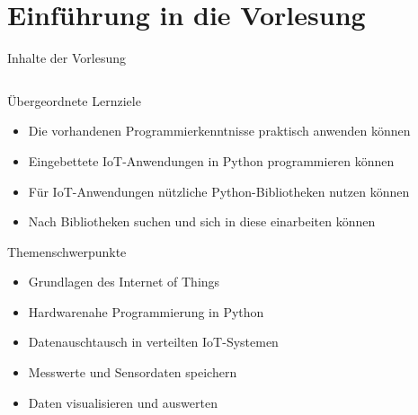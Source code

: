 \section{Einführung in die Vorlesung}
{
\scriptsize

\begin{frame}{Inhalte der Vorlesung}
    \begin{columns}
        \begin{column}[T]{.7\textwidth}
            \begin{block}{Übergeordnete Lernziele}
                \begin{itemize}
                    \item Die vorhandenen Programmierkenntnisse praktisch anwenden können
                    \item Eingebettete IoT-Anwendungen in Python programmieren können
                    \item Für IoT-Anwendungen nützliche Python-Bibliotheken nutzen können
                    \item Nach Bibliotheken suchen und sich in diese einarbeiten können
                \end{itemize}
            \end{block}

            \begin{block}{Themenschwerpunkte}
                \begin{itemize}
                    \item Grundlagen des Internet of Things
                    \item Hardwarenahe Programmierung in Python
                    \item Datenauschtausch in verteilten IoT-Systemen
                    \item Messwerte und Sensordaten speichern
                    \item Daten visualisieren und auswerten
                \end{itemize}
            \end{block}
        \end{column}


\end{columns}
\end{frame}}
